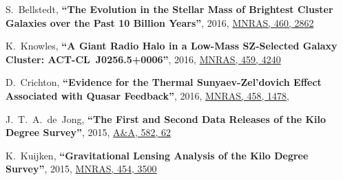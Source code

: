 \documentclass{article}
\def\myself{\textbf{\color{red} C.~Sif\'on}}
\def\aap{A\&A}
\def\mnras{MNRAS}
\newcommand{\paper}[1]{\textbf{``#1''}}
\begin{document}
\begin{etaremune}
\item
S.~Bellstedt, 
\paper{The Evolution in the Stellar Mass of Brightest Cluster Galaxies over the 
Past 10 Billion Years},
2016, \href{http://adsabs.harvard.edu/abs/2016MNRAS.460.2862B}{\mnras, 460, 2862}

\item
K.~Knowles, 
\paper{A Giant Radio Halo in a Low-Mass SZ-Selected Galaxy Cluster: ACT-CL~J0256.5+0006},
2016, \href{http://adsabs.harvard.edu/adsabs/abs/2016MNRAS.459.4240K}{\mnras, 459, 4240}

\item
D.~Crichton, 
\paper{Evidence for the Thermal Sunyaev-Zel'dovich Effect Associated with Quasar Feedback},
2016, \href{http://adsabs.harvard.edu/abs/2016MNRAS.458.1478C}{\mnras, 458, 1478},

\item
J.~T.~A.~de~Jong, 
\paper{The First and Second Data Releases of the Kilo Degree Survey},
2015, \href{http://adsabs.harvard.edu/abs/2015A&A...582A..62D}{\aap, 582, 62}

\item
K.~Kuijken, 
\paper{Gravitational Lensing Analysis of the Kilo Degree Survey},
2015, \href{http://adsabs.harvard.edu/abs/2015MNRAS.454.3500K}{\mnras, 454, 3500}


\end{etaremune}
\end{document}
